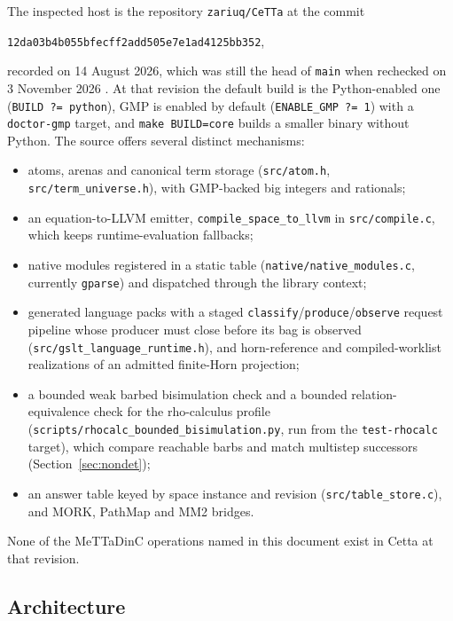 \documentclass[11pt]{article}
\newcommand{\code}[1]{\texttt{#1}}
\theoremstyle{definition}
\theoremstyle{plain}
\begin{document}
The inspected host is the repository \code{zariuq/CeTTa} at the commit
\begin{center}\code{12da03b4b055bfecff2add505e7e1ad4125bb352},\end{center}
recorded on 14 August 2026, which was still the head of \code{main} when rechecked on 3 November
2026 \cite{cettarepo}. At that revision the default build is the Python-enabled one
(\code{BUILD ?= python}), GMP is enabled by default (\code{ENABLE\_GMP ?= 1}) with a
\code{doctor-gmp} target, and \code{make BUILD=core} builds a smaller binary without Python. The
source offers several distinct mechanisms:
\begin{itemize}
\item atoms, arenas and canonical term storage (\code{src/atom.h}, \code{src/term\_universe.h}),
with GMP-backed big integers and rationals;
\item an equation-to-LLVM emitter, \code{compile\_space\_to\_llvm} in \code{src/compile.c}, which
keeps runtime-evaluation fallbacks;
\item native modules registered in a static table (\code{native/native\_modules.c}, currently
\code{gparse}) and dispatched through the library context;
\item generated language packs with a staged \code{classify}/\code{produce}/\code{observe} request
pipeline whose producer must close before its bag is observed
(\code{src/gslt\_language\_runtime.h}), and horn-reference and compiled-worklist realizations of an
admitted finite-Horn projection;
\item a bounded weak barbed bisimulation check and a bounded relation-equivalence check for the
rho-calculus profile (\code{scripts/rhocalc\_bounded\_bisimulation.py}, run from the
\code{test-rhocalc} target), which compare reachable barbs and match multistep successors
(Section~\ref{sec:nondet});
\item an answer table keyed by space instance and revision (\code{src/table\_store.c}), and MORK,
PathMap and MM2 bridges.
\end{itemize}
None of the MeTTaDinC operations named in this document exist in Cetta at that revision.

\subsection{Architecture}
\end{document}

